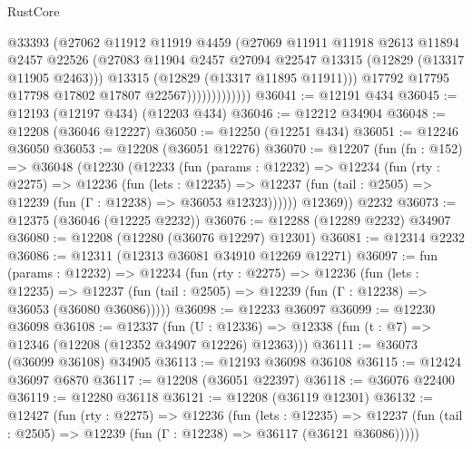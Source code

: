 \begin{lexlean}{RustCore}
\begin{coremodule}
                            @33393
                            (@27062
                              @11912
                              @11919
                              @4459
                              (@27069
                                @11911
                                @11918
                                @2613
                                @11894
                                @2457
                                @22526
                                (@27083
                                  @11904
                                  @2457
                                  @27094
                                  @22547
                                  @13315
                                  (@12829 (@13317 @11905 @2463)))
                                @13315
                                (@12829 (@13317 @11895 @11911)))
                              @17792
                              @17795
                              @17798
                              @17802
                              @17807
                              @22567)))))))))))))
@36041 := @12191 @434
@36045 := @12193 (@12197 @434) (@12203 @434)
@36046 := @12212 @34904
@36048 := @12208 (@36046 @12227)
@36050 := @12250 (@12251 @434)
@36051 := @12246 @36050
@36053 := @12208 (@36051 @12276)
@36070 := @12207
    (fun (fn : @152) =>
    @36048
      (@12230
        (@12233
          (fun (params : @12232) =>
          @12234
            (fun (rty : @2275) =>
            @12236
              (fun (lets : @12235) =>
              @12237 (fun (tail : @2505) => @12239 (fun (Γ : @12238) => @36053 @12323))))))
        @12369))
    @2232
@36073 := @12375 (@36046 (@12225 @2232))
@36076 := @12288 (@12289 @2232) @34907
@36080 := @12208 (@12280 (@36076 @12297) @12301)
@36081 := @12314 @2232
@36086 := @12311 (@12313 @36081 @34910 @12269 @12271)
@36097 := fun (params : @12232) =>
  @12234
    (fun (rty : @2275) =>
    @12236
      (fun (lets : @12235) =>
      @12237 (fun (tail : @2505) => @12239 (fun (Γ : @12238) => @36053 (@36080 @36086)))))
@36098 := @12233 @36097
@36099 := @12230 @36098
@36108 := @12337
    (fun (U : @12336) => @12338 (fun (t : @7) => @12346 (@12208 (@12352 @34907 @12226) @12363)))
@36111 := @36073 (@36099 @36108) @34905
@36113 := @12193 @36098 @36108
@36115 := @12424 @36097 @6870
@36117 := @12208 (@36051 @22397)
@36118 := @36076 @22400
@36119 := @12280 @36118
@36121 := @12208 (@36119 @12301)
@36132 := @12427
    (fun (rty : @2275) =>
    @12236
      (fun (lets : @12235) =>
      @12237 (fun (tail : @2505) => @12239 (fun (Γ : @12238) => @36117 (@36121 @36086)))))

\end{coremodule}
\end{lexlean}
